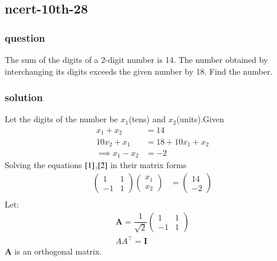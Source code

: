 \documentclass[journal,12pt,onecolumn]{IEEEtran}
\theoremstyle{remark}
\begin{document}
    \subsection{ncert-10th-28}
\subsubsection{question}
The sum of the digits of a $2$-digit number is 14. The number obtained by interchanging     its digits exceeds the given number by 18. Find the number.
\subsubsection{solution}
Let the digits of the number be $x_1$(tens) and $x_2$(units).Given
\begin{align}
    x_1+x_2 &= 14 \label{1}\\
    10x_2+x_1 &= 18 + 10x_1+x_2\\
    \implies x_1-x_2 &= -2\label{2}
\end{align}
Solving the equations $\eqref{1}$,$\eqref{2}$ in their matrix forms
\begin{align}
    \begin{pmatrix}
        1 & 1\\
        -1 & 1
    \end{pmatrix}
    \begin{pmatrix}
        x_1\\
        x_2
    \end{pmatrix} &= \begin{pmatrix}
        14\\
        -2
    \end{pmatrix}   \\
    \end{align}
    Let:
    \begin{align}
        \textbf{A}=\dfrac{1}{\sqrt{2}}\begin{pmatrix}
        1 & 1\\
        -1 & 1
    \end{pmatrix}\\
    AA^\top = \textbf{I}    
    \end{align}
    \textbf{A} is an orthogonal matrix.
\end{document}
